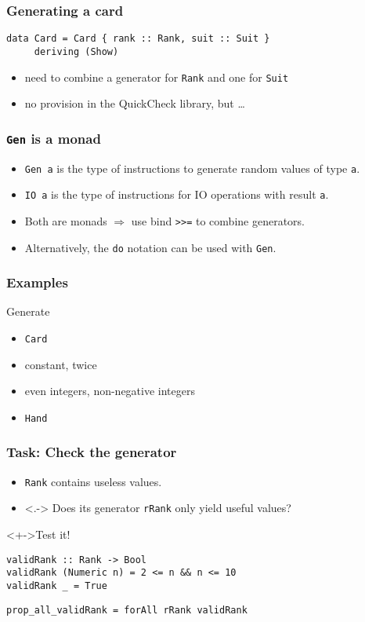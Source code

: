 \documentclass{beamer}
\begin{document}
\begin{frame}[fragile]
  \frametitle{Generating a card}
\begin{verbatim}
data Card = Card { rank :: Rank, suit :: Suit }
     deriving (Show)
\end{verbatim}
\begin{itemize}
\item need to combine a generator for \texttt{Rank} and one for \texttt{Suit}
\item no provision in the QuickCheck library, but \dots
\end{itemize}
\end{frame}
\begin{frame}[fragile]
  \frametitle{\texttt{Gen} is a monad}
  \begin{itemize}
  \item \texttt{Gen a} is the type of instructions to generate random values of type \texttt{a}.
  \item \texttt{IO a} is the type of instructions for IO operations with result \texttt{a}.
  \item Both are monads $\Rightarrow$ use bind \texttt{>>=} to combine generators.
  \item Alternatively, the \texttt{do} notation can be used with \texttt{Gen}.
  \end{itemize}
\end{frame}
\begin{frame}[fragile]
  \frametitle{Examples}
  Generate 
  \begin{itemize}
  \item \texttt{Card}
  \item constant, twice
  \item even integers, non-negative integers
  \item \texttt{Hand}
  \end{itemize}
\end{frame}
\begin{frame}[fragile]
  \frametitle{Task: Check the generator}
  \begin{itemize}
  \item<+-> \texttt{Rank} contains useless values.
  \item<.-> Does its generator \texttt{rRank} only yield useful values?
  \end{itemize}
  \begin{block}<+->{Test it!}
\begin{verbatim}
validRank :: Rank -> Bool
validRank (Numeric n) = 2 <= n && n <= 10
validRank _ = True
\end{verbatim}
\begin{verbatim}
prop_all_validRank = forAll rRank validRank
\end{verbatim}
  \end{block}
\end{frame}
\end{document}
